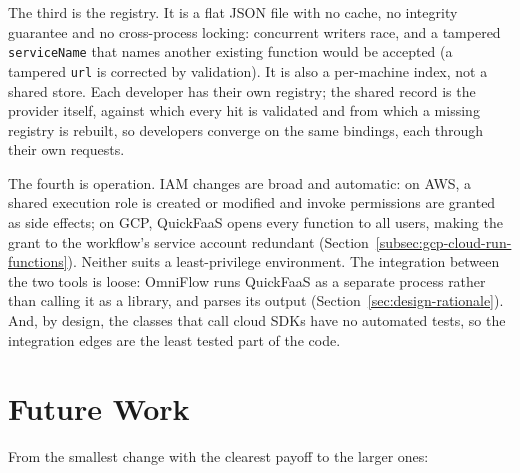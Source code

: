 The third is the registry. It is a flat JSON file with no cache, no integrity guarantee and no
cross-process locking: concurrent writers race, and a tampered \texttt{serviceName} that names
another existing function would be accepted (a tampered \texttt{url} is corrected by validation).
It is also a per-machine index, not a shared store. Each developer has their own registry; the
shared record is the provider itself, against which every hit is validated and from which a missing
registry is rebuilt, so developers converge on the same bindings, each through their own requests.

The fourth is operation. IAM changes are broad and automatic: on AWS, a shared execution role is
created or modified and invoke permissions are granted as side effects; on GCP, QuickFaaS opens
every function to all users, making the grant to the workflow's service account redundant
(Section~\ref{subsec:gcp-cloud-run-functions}). Neither suits a least-privilege environment. The
integration between the two tools is loose: OmniFlow runs QuickFaaS as a separate process rather
than calling it as a library, and parses its output (Section~\ref{sec:design-rationale}). And, by design, the classes that call cloud SDKs have no
automated tests, so the integration edges are the least tested part of the code.

\section{Future Work}
\label{sec:concl-future}

From the smallest change with the clearest payoff to the larger ones:

